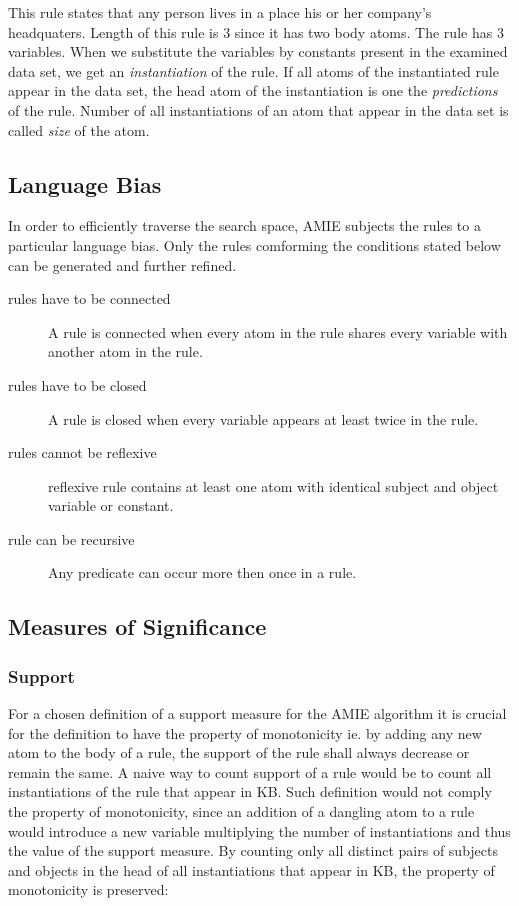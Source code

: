 This rule states that any person lives in a place his or her company's headquaters. Length of this rule is 3 since it has two body atoms. The rule has 3 variables. When we substitute the variables by constants present in the examined data set, we get an \textit{instantiation} of the rule. If all atoms of the instantiated rule appear in the data set, the head atom of the instantiation is one the \textit{predictions} of the rule. Number of all instantiations of an atom that appear in the data set is called \textit{size} of the atom.

\subsection{Language Bias\label{languagebias}}

In order to efficiently traverse the search space, AMIE subjects the rules to a particular language bias. Only the rules comforming the conditions stated below can be generated and further refined.

\begin{description}
    \item[rules have to be connected] A rule is connected when every atom in the rule shares every variable with another atom in the rule.
    \item[rules have to be closed] A rule is closed when every variable appears at least twice in the rule.
    \item[rules cannot be reflexive] reflexive rule contains at least one atom with identical subject and object variable or constant.
    \item[rule can be recursive] Any predicate can occur more then once in a rule.
\end{description}

\subsection{Measures of Significance}

\subsubsection{Support}

For a chosen definition of a support measure for the AMIE algorithm it is crucial for the definition to have the property of monotonicity ie. by adding any new atom to the body of a rule, the support of the rule shall always decrease or remain the same. A naive way to count support of a rule would be to count all instantiations of the rule that appear in KB. Such definition would not comply the property of monotonicity, since an addition of a dangling atom to a rule would introduce a new variable multiplying the number of instantiations and thus the value of the support measure. By counting only all distinct pairs of subjects and objects in the head of all instantiations that appear in KB, the property of monotonicity is preserved:

